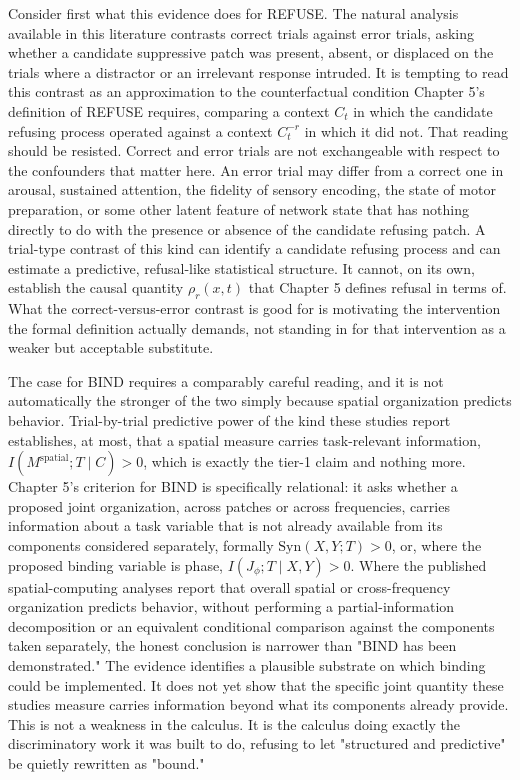 \documentclass[11pt]{book}
\begin{document}
Consider first what this evidence does for REFUSE. The natural analysis available in this literature contrasts correct trials against error trials, asking whether a candidate suppressive patch was present, absent, or displaced on the trials where a distractor or an irrelevant response intruded. It is tempting to read this contrast as an approximation to the counterfactual condition Chapter 5's definition of REFUSE requires, comparing a context $C_t$ in which the candidate refusing process operated against a context $C_t^{-r}$ in which it did not. That reading should be resisted. Correct and error trials are not exchangeable with respect to the confounders that matter here. An error trial may differ from a correct one in arousal, sustained attention, the fidelity of sensory encoding, the state of motor preparation, or some other latent feature of network state that has nothing directly to do with the presence or absence of the candidate refusing patch. A trial-type contrast of this kind can identify a candidate refusing process and can estimate a predictive, refusal-like statistical structure. It cannot, on its own, establish the causal quantity $\rho_r(x,t)$ that Chapter 5 defines refusal in terms of. What the correct-versus-error contrast is good for is motivating the intervention the formal definition actually demands, not standing in for that intervention as a weaker but acceptable substitute.

The case for BIND requires a comparably careful reading, and it is not automatically the stronger of the two simply because spatial organization predicts behavior. Trial-by-trial predictive power of the kind these studies report establishes, at most, that a spatial measure carries task-relevant information, $I(M^{\mathrm{spatial}}; T \mid C) > 0$, which is exactly the tier-1 claim and nothing more. Chapter 5's criterion for BIND is specifically relational: it asks whether a proposed joint organization, across patches or across frequencies, carries information about a task variable that is not already available from its components considered separately, formally $\mathrm{Syn}(X,Y;T) > 0$, or, where the proposed binding variable is phase, $I(J_\phi; T \mid X, Y) > 0$. Where the published spatial-computing analyses report that overall spatial or cross-frequency organization predicts behavior, without performing a partial-information decomposition or an equivalent conditional comparison against the components taken separately, the honest conclusion is narrower than "BIND has been demonstrated." The evidence identifies a plausible substrate on which binding could be implemented. It does not yet show that the specific joint quantity these studies measure carries information beyond what its components already provide. This is not a weakness in the calculus. It is the calculus doing exactly the discriminatory work it was built to do, refusing to let "structured and predictive" be quietly rewritten as "bound."
\end{document}
